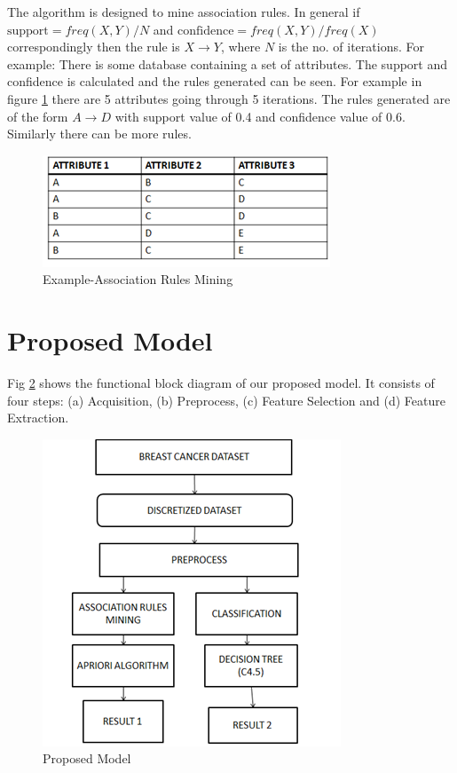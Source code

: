\documentclass[conference]{IEEEtran}
\begin{document}
The algorithm is designed to mine association rules. In general if  $\mbox{support}=freq(X,Y)/N$ and      $\mbox{confidence}=freq(X,Y)/freq(X)$  correspondingly then the rule is $X \rightarrow Y$, where $N$ is the no. of iterations.  For example: There is some database containing a set of attributes. The support and confidence is calculated and the rules generated can be seen. For example in figure \ref{fig_asso} there are 5 attributes going through 5 iterations. The rules generated are of the form $A \rightarrow D$ with support value of 0.4 and confidence value of 0.6. Similarly there can be more rules.
\begin{figure}[!h]
\centering
\includegraphics[scale=0.9]{examplenew}
\caption{Example-Association Rules Mining}
\label{fig_asso}
\end{figure}
 

 
%
\section{Proposed Model}
Fig \ref{fig_sin1} shows the functional block diagram of our proposed model. It consists of four steps: (a) Acquisition, (b) Preprocess, (c) Feature Selection and (d) Feature Extraction.
\begin{figure}[!h]
\centering
\includegraphics[scale=0.9]{proposedmodel}
\caption{Proposed Model}
\label{fig_sin1}
\end{figure}
\end{document}
